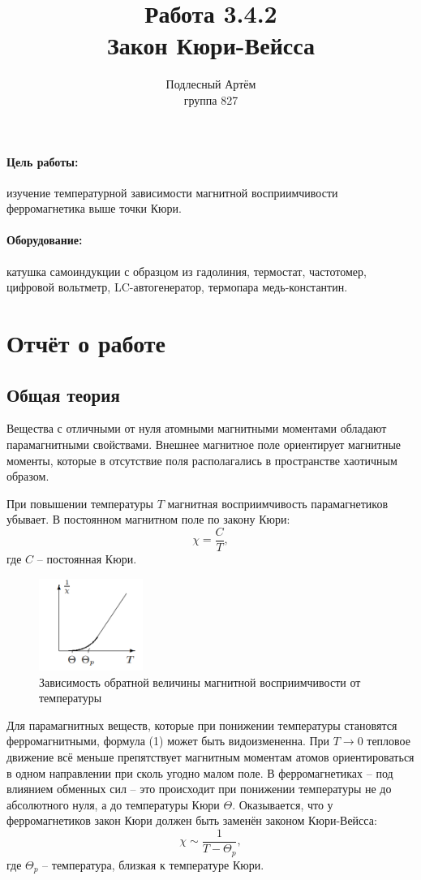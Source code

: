 \documentclass[a4paper, 14pt]{extarticle}%
\author{Подлесный Артём \\ группа 827}
\title{Работа 3.4.2 \\ Закон Кюри-Вейсса}
\newcommand\ECaption[1]{%
     \captionsetup{font=footnotesize}%
     \caption{#1}}
\begin{document}
\maketitle
\paragraph*{Цель работы: }
изучение температурной зависимости магнитной восприимчивости ферромагнетика выше точки Кюри.
\paragraph*{Оборудование: }
катушка самоиндукции с образцом из гадолиния, термостат, частотомер, цифровой вольтметр, LC-автогенератор, термопара медь-константин.
\section*{ Отчёт о работе}
\subsection*{Общая теория}
Вещества с отличными от нуля атомными магнитными моментами обладают парамагнитными свойствами. Внешнее магнитное поле ориентирует магнитные моменты, которые в отсутствие поля располагались в пространстве хаотичным образом.

При повышении температуры $T$ магнитная восприимчивость парамагнетиков убывает. В постоянном магнитном поле по закону Кюри:
\begin{equation}
\chi = \frac{C}{T},
\end{equation}
где $C$ -- постоянная Кюри.
\newpage
\begin{figure}
\begin{center}
\includegraphics[height=3cm]{teor.png}
\end{center}
\ECaption{Зависимость обратной величины магнитной восприимчивости от температуры}
\end{figure}

Для парамагнитных веществ, которые при понижении температуры становятся ферромагнитными, формула (1) может быть видоизмененна. При $T \longrightarrow 0$  тепловое движение всё меньше препятствует магнитным моментам атомов ориентироваться в одном направлении при сколь угодно малом поле. В ферромагнетиках -- под влиянием обменных сил -- это происходит при понижении температуры не до абсолютного нуля, а до температуры Кюри $\Theta$. Оказывается, что у ферромагнетиков закон Кюри должен быть заменён законом Кюри-Вейсса:
\begin{equation}
\chi\sim\dfrac{1}{T - \Theta_{p}},
\end{equation}
где $\Theta_{p}$ -- температура, близкая к температуре Кюри.
\end{document}
